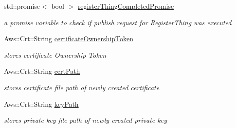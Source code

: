 \begin{DoxyCompactItemize}
\mbox{\label{class_aws_1_1_iot_1_1_device_client_1_1_fleet_provisioning_a1259c4a7d011bca3a473748dafc737c0}} 
std\+::promise$<$ bool $>$ \hyperlink{class_aws_1_1_iot_1_1_device_client_1_1_fleet_provisioning_a1259c4a7d011bca3a473748dafc737c0}{register\+Thing\+Completed\+Promise}
\begin{DoxyCompactList}\small\item\em a promise variable to check if publish request for Register\+Thing was executed \end{DoxyCompactList}\item 
\mbox{\label{class_aws_1_1_iot_1_1_device_client_1_1_fleet_provisioning_ae0b788ac815eba2ee89dc1ace2189aba}} 
Aws\+::\+Crt\+::\+String \hyperlink{class_aws_1_1_iot_1_1_device_client_1_1_fleet_provisioning_ae0b788ac815eba2ee89dc1ace2189aba}{certificate\+Ownership\+Token}
\begin{DoxyCompactList}\small\item\em stores certificate Ownership Token \end{DoxyCompactList}\item 
\mbox{\label{class_aws_1_1_iot_1_1_device_client_1_1_fleet_provisioning_a03535dae9cd461c763134f6bef30448d}} 
Aws\+::\+Crt\+::\+String \hyperlink{class_aws_1_1_iot_1_1_device_client_1_1_fleet_provisioning_a03535dae9cd461c763134f6bef30448d}{cert\+Path}
\begin{DoxyCompactList}\small\item\em stores certificate file path of newly created certificate \end{DoxyCompactList}\item 
\mbox{\label{class_aws_1_1_iot_1_1_device_client_1_1_fleet_provisioning_a1ab0c65a121383574f39b48edbf06b38}} 
Aws\+::\+Crt\+::\+String \hyperlink{class_aws_1_1_iot_1_1_device_client_1_1_fleet_provisioning_a1ab0c65a121383574f39b48edbf06b38}{key\+Path}
\begin{DoxyCompactList}\small\item\em stores private key file path of newly created private key \end{DoxyCompactList}\item 

\end{DoxyCompactItemize}

